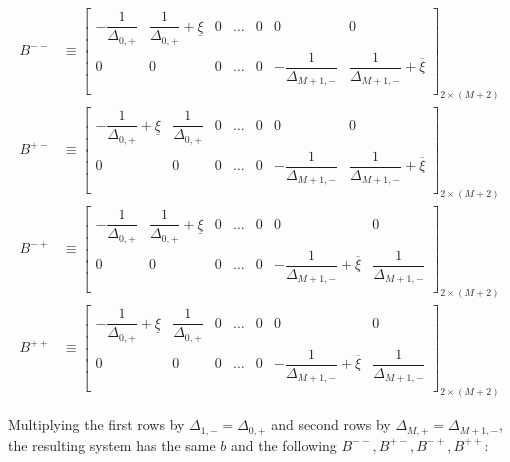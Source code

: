 \documentclass[11pt]{article}
\theoremstyle{definition}
\begin{document}
\begin{align}
B^{--} &\equiv 
\begin{bmatrix}
-\dfrac{1}{\Delta_{0,+}} & \dfrac{1}{\Delta_{0,+}}  + \underline{\xi} & 0 & \dots & 0 & 0 & 0 \\
0 & 0 & 0 & \dots & 0 & -\dfrac{1}{\Delta_{M+1,-}} & \dfrac{1}{\Delta_{M+1,-}} + \overline{\xi}\\
\end{bmatrix}_{2 \times (M+2)} \\
B^{+-} &\equiv 
\begin{bmatrix}
-\dfrac{1}{\Delta_{0,+}} + \underline{\xi} & \dfrac{1}{\Delta_{0,+}} & 0 & \dots & 0 & 0 & 0 \\
0 & 0 & 0 & \dots & 0 & -\dfrac{1}{\Delta_{M+1,-}} & \dfrac{1}{\Delta_{M+1,-}} + \overline{\xi}\\
\end{bmatrix}_{2 \times (M+2)} \\
B^{-+} &\equiv 
\begin{bmatrix}
-\dfrac{1}{\Delta_{0,+}}  & \dfrac{1}{\Delta_{0,+}} + \underline{\xi} & 0 & \dots & 0 & 0 & 0 \\
0 & 0 & 0 & \dots & 0 & -\dfrac{1}{\Delta_{M+1,-}}+ \overline{\xi} & \dfrac{1}{\Delta_{M+1,-}}\\
\end{bmatrix}_{2 \times (M+2)} \\
B^{++} &\equiv 
\begin{bmatrix}
-\dfrac{1}{\Delta_{0,+}} + \underline{\xi} & \dfrac{1}{\Delta_{0,+}} & 0 & \dots & 0 & 0 & 0 \\
0 & 0 & 0 & \dots & 0 & -\dfrac{1}{\Delta_{M+1,-}}+ \overline{\xi} & \dfrac{1}{\Delta_{M+1,-}} \\
\end{bmatrix}_{2 \times (M+2)}
\end{align}

Multiplying the first rows by $\Delta_{1,-} = \Delta_{0,+}$ and second rows by $\Delta_{M,+} = \Delta_{M+1,-} $, the resulting system has the same $b$ and the following $B^{--}, B^{+-}, B^{-+}, B^{++}$:
\end{document}

